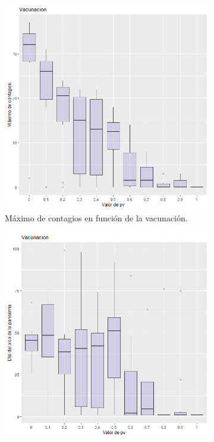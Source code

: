 \documentclass{article}
\begin{document}
\begin{figure}
     \begin{subfigure}[]{.4\linewidth}
         \includegraphics[width=\linewidth]{p6_infectados_r1.png}
         \caption{Máximo de contagios en función de la vacunación.}
         \label{3a}
     \end{subfigure}
     \begin{subfigure}[]{.4\linewidth}
         \includegraphics[width=\linewidth]{p6_dia_r1.png}

\end{subfigure}
\end{figure}
\end{document}
